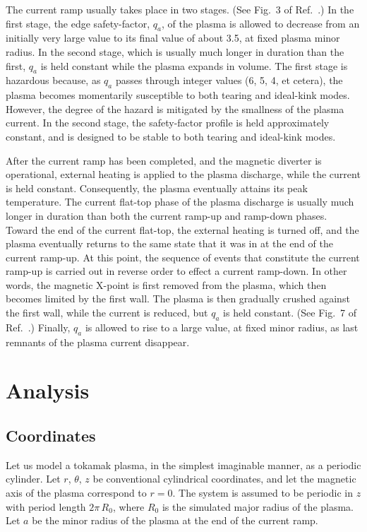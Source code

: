 \documentclass[12pt,prb,aps]{revtex4-1}
\begin{document}
The current ramp usually takes place in two stages.  (See Fig.~3 of Ref.~.) In the first stage, the edge safety-factor, $q_a$, of the  plasma is allowed to decrease from
an initially very large value to its final value of about 3.5, at fixed plasma minor radius. In the second stage, which is usually much longer in duration than the first, $q_a$ is held constant
while the plasma expands in volume. The first stage is hazardous because, as $q_a$ passes through integer values (6, 5, 4, et cetera), the plasma becomes
momentarily susceptible  to both tearing and ideal-kink modes.\cite{wesson,granetz1,cheng} However, the degree of the hazard is mitigated by the smallness of the plasma current.
In the second stage, the safety-factor profile is  held approximately constant, and is designed to be stable to both tearing and ideal-kink modes. 

After the current ramp has been completed, and the magnetic diverter is operational,  external heating is applied to the plasma discharge, while the  current is held constant.
Consequently, 
the plasma eventually attains its peak temperature. The current flat-top phase of the plasma discharge is usually much longer in duration than both the current ramp-up and ramp-down
phases. Toward the end of the current flat-top, the external heating is turned off, and the plasma eventually returns to the same state that it was in at the end of the
current ramp-up. At this point, the sequence of events that constitute the current ramp-up is carried out in reverse order to effect a current ramp-down. In other words, the magnetic X-point
is first removed from the plasma, which  then becomes limited by the first wall. The plasma is then gradually crushed against the first wall, while the current is reduced, but
$q_a$ is held constant. (See Fig.~7 of Ref.~.) Finally, $q_a$ is allowed to rise to a large value, at fixed minor radius,  as last remnants of the plasma current disappear. 

\section{Analysis}
\subsection{Coordinates}
Let us model a tokamak plasma, in the simplest imaginable manner, as a periodic cylinder. Let $r$, $\theta$, $z$ be conventional cylindrical coordinates, and
let the magnetic axis of the plasma correspond to $r=0$. The system is assumed to be periodic in $z$ with period length $2\pi\,R_0$, where $R_0$ is the
simulated major radius of the plasma. Let $a$ be the minor radius of the plasma at the end of the current ramp. 
\end{document}
